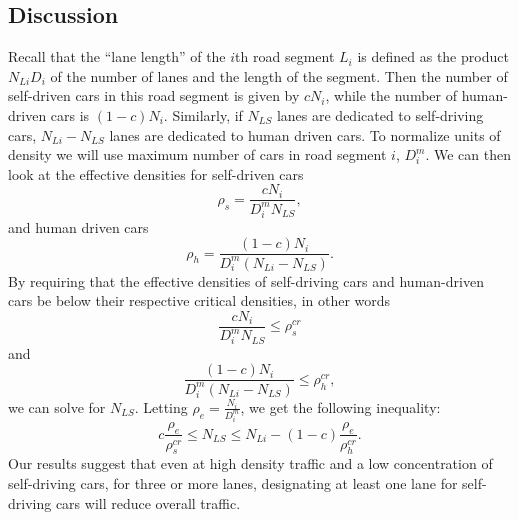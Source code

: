 \subsection{Discussion}
Recall that the ``lane length'' of the $i$th road segment $L_i$ is defined as the product $N_{Li}D_i$ of the number of lanes and the length of the segment. Then the number of self-driven cars in this road segment is given by $cN_i$, while the number of human-driven cars is $(1-c)N_i$. Similarly, if $N_{LS}$ lanes are dedicated to self-driving cars, $N_{Li}-N_{LS}$ lanes are dedicated to human driven cars. To normalize units of density we will use maximum number of cars in road segment $i$, $D_i^m$. We can then look at the effective densities for self-driven cars
\begin{equation*}
	\rho_s = \frac{cN_i}{D_i^mN_{LS}},
\end{equation*}
and human driven cars
\begin{equation*}
\rho_h = \frac{(1-c)N_i}{D_i^m(N_{Li}-N_{LS})}.
\end{equation*}
By requiring that the effective densities of self-driving cars and human-driven cars be below their respective critical densities, in other words
\begin{equation*}
	\frac{cN_i}{D_i^mN_{LS}} \leq \rho_{s}^{cr}
\end{equation*}
and
\begin{equation*}
    \frac{(1-c)N_i}{D_i^m(N_{Li}-N_{LS})} \leq \rho_{h}^{cr},
\end{equation*}
we can solve for $N_{LS}$. Letting $\rho_e=\frac{N_i}{D_i^m}$, we get the following inequality:
\begin{equation}
    c\frac{\rho_e}{\rho_{s}^{cr}} \leq N_{LS} \leq N_{Li} - (1-c)\frac{\rho_e}{\rho_{h}^{cr}}.
\end{equation}
Our results suggest that even at high density traffic and a low concentration of self-driving cars, for three or more lanes, designating at least one lane for self-driving cars will reduce overall traffic.